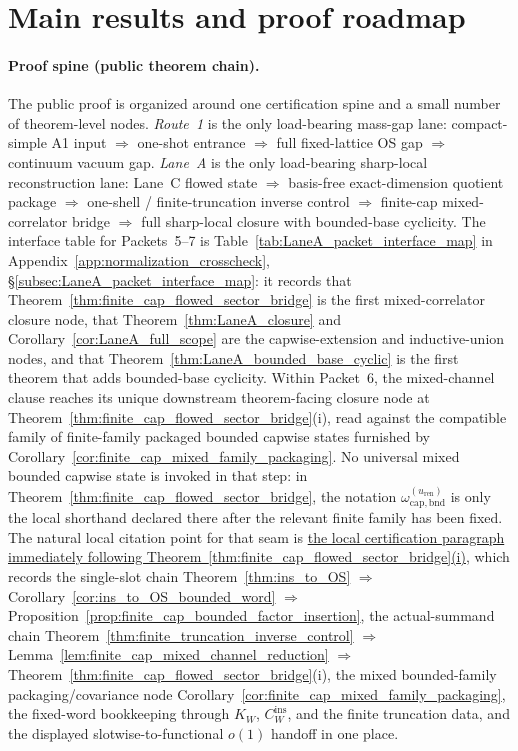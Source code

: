 \section{Main results and proof roadmap}
\label{sec:roadmap}

\paragraph{Proof spine (public theorem chain).}
The public proof is organized around one certification spine and a small number of theorem-level nodes.
\emph{Route~1} is the only load-bearing mass-gap lane:
compact-simple A1 input $\Rightarrow$ one-shot entrance $\Rightarrow$ full fixed-lattice OS gap $\Rightarrow$ continuum vacuum gap.
\emph{Lane~A} is the only load-bearing sharp-local reconstruction lane:
Lane~C flowed state $\Rightarrow$ basis-free exact-dimension quotient package $\Rightarrow$ one-shell / finite-truncation inverse control $\Rightarrow$ finite-cap mixed-correlator bridge $\Rightarrow$ full sharp-local closure with bounded-base cyclicity.
The interface table for Packets~5--7 is Table~\ref{tab:LaneA_packet_interface_map} in Appendix~\ref{app:normalization_crosscheck}, \S\ref{subsec:LaneA_packet_interface_map}: it records that Theorem~\ref{thm:finite_cap_flowed_sector_bridge} is the first mixed-correlator closure node, that Theorem~\ref{thm:LaneA_closure} and Corollary~\ref{cor:LaneA_full_scope} are the capwise-extension and inductive-union nodes, and that Theorem~\ref{thm:LaneA_bounded_base_cyclic} is the first theorem that adds bounded-base cyclicity.
Within Packet~6, the mixed-channel clause reaches its unique downstream theorem-facing closure node at Theorem~\ref{thm:finite_cap_flowed_sector_bridge}(i), read against the compatible family of finite-family packaged bounded capwise states furnished by Corollary~\ref{cor:finite_cap_mixed_family_packaging}.
No universal mixed bounded capwise state is invoked in that step: in Theorem~\ref{thm:finite_cap_flowed_sector_bridge}, the notation $\omega_{\mathrm{cap,bnd}}^{(u_{\mathrm{ren}})}$ is only the local shorthand declared there after the relevant finite family has been fixed.
The natural local citation point for that seam is \hyperref[par:finite_cap_mixed_channel_certification]{the local certification paragraph immediately following Theorem~\ref{thm:finite_cap_flowed_sector_bridge}(i)}, which records the single-slot chain Theorem~\ref{thm:ins_to_OS} $\Rightarrow$ Corollary~\ref{cor:ins_to_OS_bounded_word} $\Rightarrow$ Proposition~\ref{prop:finite_cap_bounded_factor_insertion}, the actual-summand chain Theorem~\ref{thm:finite_truncation_inverse_control} $\Rightarrow$ Lemma~\ref{lem:finite_cap_mixed_channel_reduction} $\Rightarrow$ Theorem~\ref{thm:finite_cap_flowed_sector_bridge}(i), the mixed bounded-family packaging/covariance node Corollary~\ref{cor:finite_cap_mixed_family_packaging}, the fixed-word bookkeeping through $K_W$, $C_W^{\mathrm{ins}}$, and the finite truncation data, and the displayed slotwise-to-functional $o(1)$ handoff in one place.
